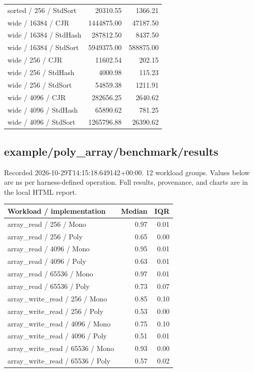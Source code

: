 \begin{longtable}{p{}rr}
sorted / 256 / StdSort & 20310.55 & 1366.21 \\
wide / 16384 / CJR & 1444875.00 & 47187.50 \\
wide / 16384 / StdHash & 287812.50 & 8437.50 \\
wide / 16384 / StdSort & 5949375.00 & 588875.00 \\
wide / 256 / CJR & 11602.54 & 202.15 \\
wide / 256 / StdHash & 4000.98 & 115.23 \\
wide / 256 / StdSort & 54859.38 & 1211.91 \\
wide / 4096 / CJR & 282656.25 & 2640.62 \\
wide / 4096 / StdHash & 65890.62 & 781.25 \\
wide / 4096 / StdSort & 1265796.88 & 26390.62 \\
\end{longtable}
\subsection{example/poly\_array/benchmark/results}
Recorded 2026-10-29T14:15:18.649142+00:00. 12 workload groups. Values below are ns per harness-defined operation. Full results, provenance, and charts are in the local HTML report.
\begin{longtable}{p{}rr}Workload / implementation & Median & IQR \\ \hline
array\_read / 256 / Mono & 0.97 & 0.01 \\
array\_read / 256 / Poly & 0.65 & 0.00 \\
array\_read / 4096 / Mono & 0.95 & 0.01 \\
array\_read / 4096 / Poly & 0.63 & 0.01 \\
array\_read / 65536 / Mono & 0.97 & 0.01 \\
array\_read / 65536 / Poly & 0.73 & 0.07 \\
array\_write\_read / 256 / Mono & 0.85 & 0.10 \\
array\_write\_read / 256 / Poly & 0.53 & 0.00 \\
array\_write\_read / 4096 / Mono & 0.75 & 0.10 \\
array\_write\_read / 4096 / Poly & 0.51 & 0.01 \\
array\_write\_read / 65536 / Mono & 0.93 & 0.00 \\
array\_write\_read / 65536 / Poly & 0.57 & 0.02 \\
\end{longtable}
